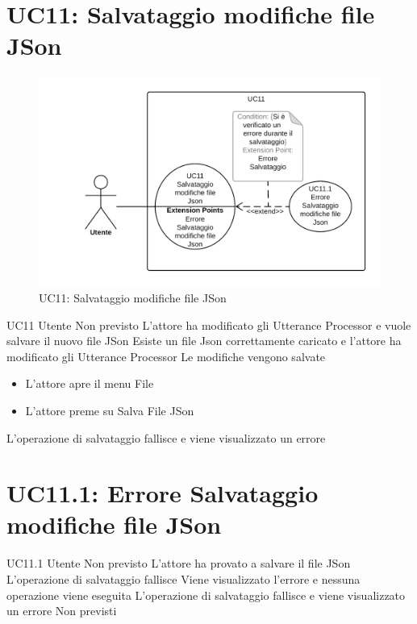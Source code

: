 \documentclass[../AnalisideiRequisiti.tex]{subfiles}
\begin{document}
\section{UC11: Salvataggio modifiche file JSon}
\begin{figure}[H]
	\centering
	\includegraphics[width=\textwidth]{../img/UC11.png}
	\caption{UC11: Salvataggio modifiche file JSon}
\end{figure}
\UserCase
{UC11}
{Utente}
{Non previsto}
{L'attore ha modificato gli Utterance Processor e vuole salvare il nuovo file JSon}
{Esiste un file Json correttamente caricato  e l'attore ha modificato gli Utterance Processor  }
{Le modifiche vengono salvate}
{
	\begin{itemize}
		\item{} L'attore apre il menu File 
		\item{} L'attore preme su Salva File JSon
	\end{itemize}
}
{L'operazione di salvataggio fallisce e viene visualizzato un errore }

\section{UC11.1: Errore Salvataggio modifiche file JSon}
\UserCase
{UC11.1}
{Utente}
{Non previsto}
{L'attore ha provato a salvare il file JSon}
{L'operazione di salvataggio fallisce}
{Viene visualizzato l'errore e nessuna operazione viene eseguita}
{L'operazione di salvataggio fallisce e viene visualizzato un errore}
{Non previsti}
\end{document}
